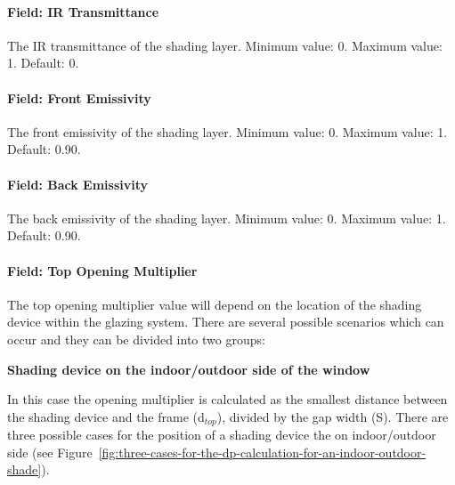 \paragraph{Field: IR Transmittance}\label{field-ir-transmittance}

The IR transmittance of the shading layer. Minimum value: 0. Maximum value: 1. Default: 0.

\paragraph{Field: Front Emissivity}\label{field-front-emissivity}

The front emissivity of the shading layer. Minimum value: 0. Maximum value: 1. Default: 0.90.

\paragraph{Field: Back Emissivity}\label{field-back-emissivity}

The back emissivity of the shading layer. Minimum value: 0. Maximum value: 1. Default: 0.90.

\paragraph{Field: Top Opening Multiplier}\label{field-top-opening-multiplier-1}

The top opening multiplier value will depend on the location of the shading device within the glazing system. There are several possible scenarios which can occur and they can be divided into two groups:

\textbf{Shading device on the indoor/outdoor side of the window}

In this case the opening multiplier is calculated as the smallest distance between the shading device and the frame (d\(_{top}\)), divided by the gap width (S). There are three possible cases for the position of a shading device the on indoor/outdoor side (see Figure~\ref{fig:three-cases-for-the-dp-calculation-for-an-indoor-outdoor-shade}).

